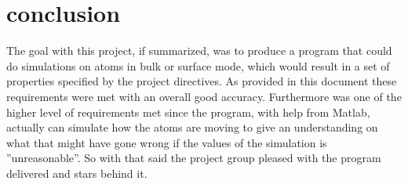 \section{conclusion}
The goal with this project, if summarized, was to produce a program that could do simulations on atoms in bulk or surface mode, which would result in a set of properties specified by the project directives. As provided in this document these requirements were met with an overall good accuracy. Furthermore was one of the higher level of requirements met since the program, with help from Matlab, actually can simulate how the atoms are moving to give an understanding on what that might have gone wrong if the values of the simulation is ''unreasonable''. So with that said the project group pleased with the program delivered and stars behind it.